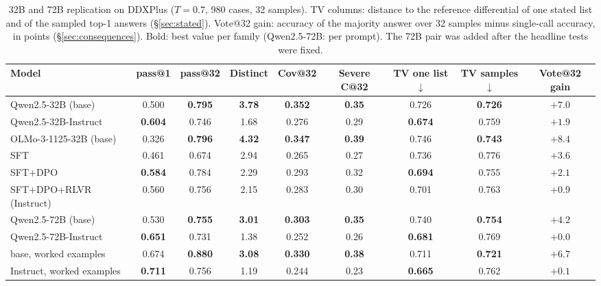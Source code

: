 \documentclass[11pt]{article}
\begin{document}
\begin{table}[t]
\centering\small
\setlength{\tabcolsep}{3.5pt}
\begin{adjustbox}{max width=\linewidth}
\begin{tabular}{lcccccccc}
\toprule
Model & pass@1 & pass@32 & Distinct & Cov@32 & Severe C@32 & TV one list$\downarrow$ & TV samples$\downarrow$ & Vote@32 gain \\
\midrule
Qwen2.5-32B (base) & 0.500 & \textbf{0.795} & \textbf{3.78} & \textbf{0.352} & \textbf{0.35} & 0.726 & \textbf{0.726} & $+7.0$ \\
Qwen2.5-32B-Instruct & \textbf{0.604} & 0.746 & 1.68 & 0.276 & 0.29 & \textbf{0.674} & 0.759 & $+1.9$ \\
\midrule
OLMo-3-1125-32B (base) & 0.326 & \textbf{0.796} & \textbf{4.32} & \textbf{0.347} & \textbf{0.39} & 0.746 & \textbf{0.743} & $+8.4$ \\
\quad SFT & 0.461 & 0.674 & 2.94 & 0.265 & 0.27 & 0.736 & 0.776 & $+3.6$ \\
\quad SFT+DPO & \textbf{0.584} & 0.784 & 2.29 & 0.293 & 0.32 & \textbf{0.694} & 0.755 & $+2.1$ \\
\quad SFT+DPO+RLVR (Instruct) & 0.560 & 0.756 & 2.15 & 0.283 & 0.30 & 0.701 & 0.763 & $+0.9$ \\
\midrule
Qwen2.5-72B (base) & 0.530 & \textbf{0.755} & \textbf{3.01} & \textbf{0.303} & \textbf{0.35} & 0.740 & \textbf{0.754} & $+4.2$ \\
Qwen2.5-72B-Instruct & \textbf{0.651} & 0.731 & 1.38 & 0.252 & 0.26 & \textbf{0.681} & 0.769 & $+0.0$ \\
\quad base, worked examples & 0.674 & \textbf{0.880} & \textbf{3.08} & \textbf{0.330} & \textbf{0.38} & 0.711 & \textbf{0.721} & $+6.7$ \\
\quad Instruct, worked examples & \textbf{0.711} & 0.756 & 1.19 & 0.244 & 0.23 & \textbf{0.665} & 0.762 & $+0.1$ \\
\bottomrule
\end{tabular}
\end{adjustbox}
\caption{32B and 72B replication on DDXPlus ($T{=}0.7$, 980 cases, 32 samples). TV columns: distance to the reference differential of one stated list and of the sampled top-1 answers (\S\ref{sec:stated}). Vote@32 gain: accuracy of the majority answer over 32 samples minus single-call accuracy, in points (\S\ref{sec:consequences}). Bold: best value per family (Qwen2.5-72B: per prompt). The 72B pair was added after the headline tests were fixed.}
\label{tab:big32}
\end{table}
\end{document}
